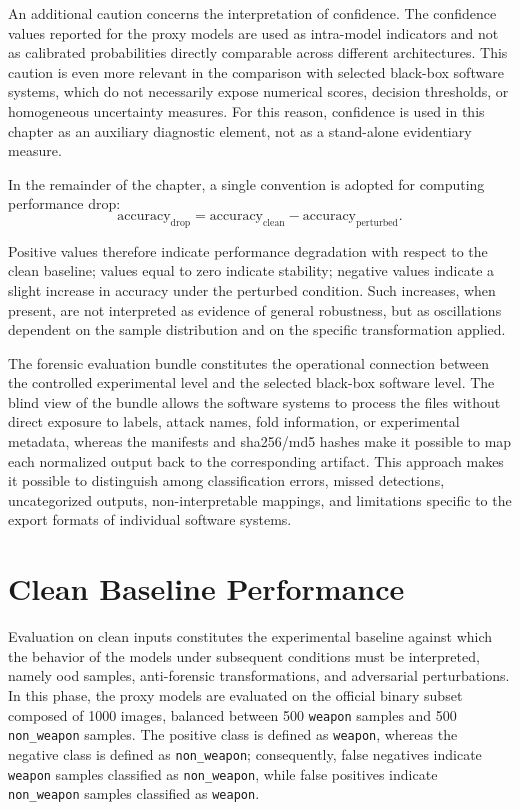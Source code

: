 An additional caution concerns the interpretation of confidence. The confidence
values reported for the proxy models are used as intra-model indicators and not
as calibrated probabilities directly comparable across different architectures.
This caution is even more relevant in the comparison with selected black-box
software systems, which do not necessarily expose numerical scores, decision
thresholds, or homogeneous uncertainty measures. For this reason, confidence is
used in this chapter as an auxiliary diagnostic element, not as a stand-alone
evidentiary measure.

In the remainder of the chapter, a single convention is adopted for computing
performance drop:
\[
\text{accuracy}_{\mathrm{drop}} =
\text{accuracy}_{\mathrm{clean}} - \text{accuracy}_{\mathrm{perturbed}}.
\]

Positive values therefore indicate performance degradation with respect to the
clean baseline; values equal to zero indicate stability; negative values
indicate a slight increase in accuracy under the perturbed condition. Such
increases, when present, are not interpreted as evidence of general robustness,
but as oscillations dependent on the sample distribution and on the specific
transformation applied.

The forensic evaluation bundle constitutes the operational connection between
the controlled experimental level and the selected black-box software level.
The blind view of the bundle allows the software systems to process the files
without direct exposure to labels, attack names, fold information, or
experimental metadata, whereas the manifests and \gls{sha256}/\gls{md5} hashes
make it possible to map each normalized output back to the corresponding
artifact. This approach makes it possible to distinguish among classification
errors, missed detections, uncategorized outputs, non-interpretable mappings,
and limitations specific to the export formats of individual software systems.


\section{Clean Baseline Performance}
\label{sec:results-clean-baseline}

Evaluation on clean inputs constitutes the experimental baseline against which
the behavior of the models under subsequent conditions must be interpreted,
namely \gls{ood} samples, anti-forensic transformations, and adversarial
perturbations. In this phase, the proxy models are evaluated on the official
binary subset composed of 1000 images, balanced between 500 \texttt{weapon}
samples and 500 \texttt{non\_weapon} samples. The positive class is defined as
\texttt{weapon}, whereas the negative class is defined as
\texttt{non\_weapon}; consequently, false negatives indicate
\texttt{weapon} samples classified as \texttt{non\_weapon}, while false
positives indicate \texttt{non\_weapon} samples classified as \texttt{weapon}.

